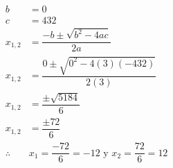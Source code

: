 \begin{solutionbox}{10.5cm}
\begin{multicols}{2}
\[\begin{array}{rl}
                b          & =0                                                        \\
                c          & =432                                                      \\
                x_{1,2}    & = \dfrac{-b\pm\sqrt{b^2-4ac}}{2a}                         \\[2em]
                x_{1,2}    & = \dfrac{0\pm\sqrt{0^2-4(3)(-432)}}{2(3)}                 \\[2em]
                x_{1,2}    & = \dfrac{\pm\sqrt{5184}}{6}                               \\[2em]
                x_{1,2}    & = \dfrac{\pm72}{6}                                        \\[2em]
                \therefore & x_1 =\dfrac{-72}{6}=-12 \text{ y }  x_2 =\dfrac{72}{6}=12 \\[2em]
            \end{array}
        \]
    \end{multicols}
\end{solutionbox}
